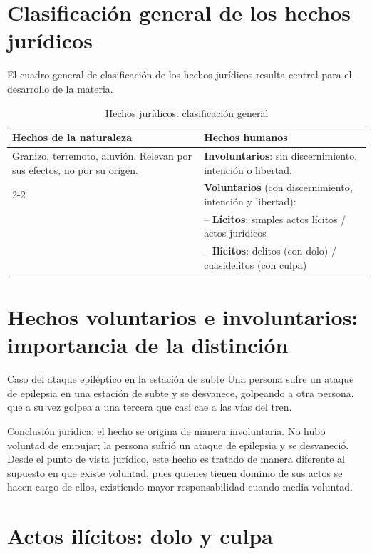 \documentclass[12pt,oneside]{book}
\begin{document}
\section{Clasificación general de los hechos jurídicos}

El cuadro general de clasificación de los hechos jurídicos resulta central para el desarrollo de la materia.

\begin{table}[H]
\centering
\caption{Hechos jurídicos: clasificación general}
\begin{tabularx}{\textwidth}{X X}
\toprule
\textbf{Hechos de la naturaleza} & \textbf{Hechos humanos} \\
\midrule
Granizo, terremoto, aluvión. Relevan por sus efectos, no por su origen. &
\textbf{Involuntarios}: sin discernimiento, intención o libertad. \\
\cmidrule(l){2-2}
 & \textbf{Voluntarios} (con discernimiento, intención y libertad): \\
 & \quad -- \textbf{Lícitos}: simples actos lícitos / actos jurídicos \\
 & \quad -- \textbf{Ilícitos}: delitos (con dolo) / cuasidelitos (con culpa) \\
\bottomrule
\end{tabularx}
\end{table}

\section{Hechos voluntarios e involuntarios: importancia de la distinción}

\begin{example}{Caso del ataque epiléptico en la estación de subte}
Una persona sufre un ataque de epilepsia en una estación de subte y se desvanece, golpeando a otra persona, que a su vez golpea a una tercera que casi cae a las vías del tren.

Conclusión jurídica: el hecho se origina de manera involuntaria. No hubo voluntad de empujar; la persona sufrió un ataque de epilepsia y se desvaneció. Desde el punto de vista jurídico, este hecho es tratado de manera diferente al supuesto en que existe voluntad, pues quienes tienen dominio de sus actos se hacen cargo de ellos, existiendo mayor responsabilidad cuando media voluntad.
\end{example}

\section{Actos ilícitos: dolo y culpa}
\end{document}
